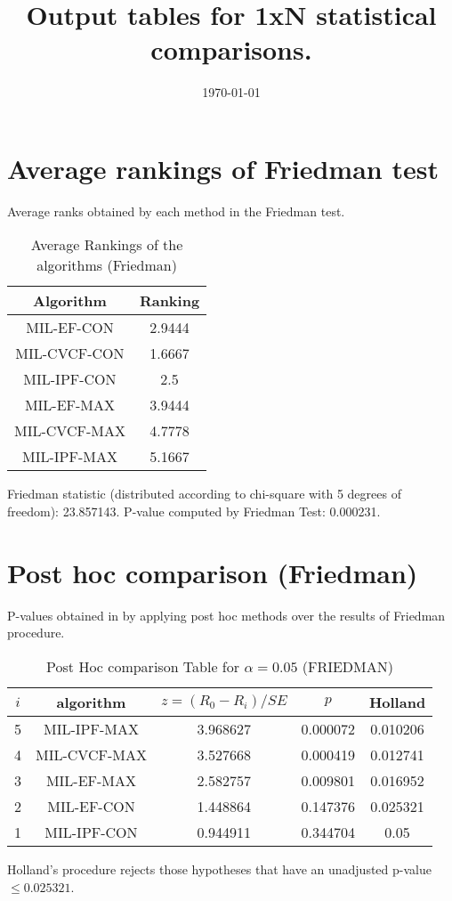 \documentclass[a4paper,10pt]{article}
\title{Output tables for 1xN statistical comparisons.}
\author{}
\date{\today}
\begin{document}
\begin{landscape}
\pagestyle{empty}
\maketitle
\thispagestyle{empty}

\section{Average rankings of Friedman test}


Average ranks obtained by each method in the Friedman test.

\begin{table}[!htp]
\centering
\begin{tabular}{|c|c|}\hline
Algorithm&Ranking\\\hline
MIL-EF-CON&2.9444\\MIL-CVCF-CON&1.6667\\MIL-IPF-CON&2.5\\MIL-EF-MAX&3.9444\\MIL-CVCF-MAX&4.7778\\MIL-IPF-MAX&5.1667\\\hline\end{tabular}
\caption{Average Rankings of the algorithms (Friedman)}
\end{table}

Friedman statistic (distributed according to chi-square with 5 degrees of freedom): 23.857143. \newline P-value computed by Friedman Test: 0.000231.\newline


\newpage

\section{Post hoc comparison (Friedman)}


P-values obtained in by applying post hoc methods over the results of Friedman procedure.

\begin{table}[!htp]
\centering\footnotesize
\begin{tabular}{ccccc}
$i$&algorithm&$z=(R_0 - R_i)/SE$&$p$&Holland\\
\hline5&MIL-IPF-MAX&3.968627&0.000072&0.010206\\4&MIL-CVCF-MAX&3.527668&0.000419&0.012741\\3&MIL-EF-MAX&2.582757&0.009801&0.016952\\2&MIL-EF-CON&1.448864&0.147376&0.025321\\1&MIL-IPF-CON&0.944911&0.344704&0.05\\\hline
\end{tabular}
\caption{Post Hoc comparison Table for $\alpha=0.05$ (FRIEDMAN)}
\end{table}Holland's procedure rejects those hypotheses that have an unadjusted p-value $\le0.025321$.



\end{landscape}
\end{document}
